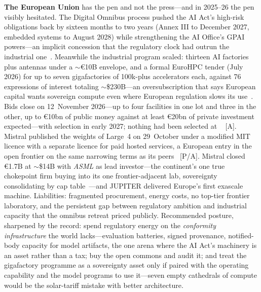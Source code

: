 \textbf{The European Union} has the pen and not the press---and in 2025--26 the pen visibly hesitated. The Digital Omnibus process pushed the AI Act's high-risk obligations back by sixteen months to two years (Annex III to December 2027, embedded systems to August 2028) while strengthening the AI Office's GPAI powers---an implicit concession that the regulatory clock had outrun the industrial one~\cite{eu-omnibus}. Meanwhile the industrial program scaled: thirteen AI factories plus antennas under a $\sim$€10B envelope, and a formal EuroHPC tender (July 2026) for up to seven gigafactories of 100k-plus accelerators each, against 76 expressions of interest totaling $\sim$\$230B---an oversubscription that says European capital wants sovereign compute even where European regulation slows its use~\cite{eu-gigafactories,eu-giga-tender}. Bids close on 12~November 2026---up to four facilities in one lot and three in the other, up to €10bn of public money against at least €20bn of private investment expected---with selection in early 2027; nothing had been selected at \datafreeze~\cite{gov-eu-giga-close} [A]. Mistral published the weights of Large~4 on 29~October under a modified MIT licence with a separate licence for paid hosted services, a European entry in the open frontier on the same narrowing terms as its peers~\cite{mdl-mistral-large4} [P/A]. Mistral closed €1.7B at $\sim$\$14B with \emph{ASML} as lead investor---the continent's one true chokepoint firm buying into its one frontier-adjacent lab, sovereignty consolidating by cap table~\cite{mistral-asml}---and JUPITER delivered Europe's first exascale machine. Liabilities: fragmented procurement, energy costs, no top-tier frontier laboratory, and the persistent gap between regulatory ambition and industrial capacity that the omnibus retreat priced publicly. Recommended posture, sharpened by the record: spend regulatory energy on the \emph{conformity infrastructure} the world lacks---evaluation batteries, signed provenance, notified-body capacity for model artifacts, the one arena where the AI Act's machinery is an asset rather than a tax; buy the open commons and audit it; and treat the gigafactory programme as a sovereignty asset only if paired with the operating capability and the model programs to use it---seven empty cathedrals of compute would be the solar-tariff mistake with better architecture.

